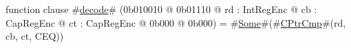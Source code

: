 function clause #\hyperref[zdecode]{decode}# (0b010010 @ 0b01110 @ rd : IntRegEnc @ cb : CapRegEnc @ ct : CapRegEnc @ 0b000 @ 0b000) = #\hyperref[zSome]{Some}#(#\hyperref[zCPtrCmp]{CPtrCmp}#(rd, cb, ct, CEQ))
